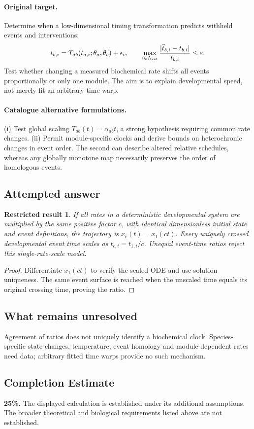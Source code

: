 \documentclass[11pt]{article}
\newtheorem{attemptresult}{Restricted result}[section]
\begin{document}
\paragraph{Original target.}
Determine when a low-dimensional timing transformation predicts withheld events and interventions:
\[
 t_{b,i}=T_{ab}(t_{a,i};\theta_a,\theta_b)+\epsilon_i,
\qquad
\max_{i\in I_{\rm test}}\frac{|\widehat t_{b,i}-t_{b,i}|}{t_{b,i}}\leq\varepsilon.
\]
Test whether changing a measured biochemical rate shifts all events proportionally or only one module. The aim is to explain developmental speed, not merely fit an arbitrary time warp.
\paragraph{Catalogue alternative formulations.}
(i) Test global scaling $T_{ab}(t)=\alpha_{ab}t$, a strong hypothesis requiring common rate changes. (ii) Permit module-specific clocks and derive bounds on heterochronic changes in event order. The second can describe altered relative schedules, whereas any globally monotone map necessarily preserves the order of homologous events.
\subsection{Attempted answer}
\begin{attemptresult}
If all rates in a deterministic developmental system are multiplied by the same positive factor $c$, with identical dimensionless initial state and event definitions, the trajectory is $x_c(t)=x_1(ct)$. Every uniquely crossed developmental event time scales as $t_{c,i}=t_{1,i}/c$. Unequal event-time ratios reject this single-rate-scale model.
\end{attemptresult}
\begin{proof}
Differentiate $x_1(ct)$ to verify the scaled ODE and use solution uniqueness. The same event surface is reached when the unscaled time equals its original crossing time, proving the ratio.
\end{proof}
\subsection{What remains unresolved}
Agreement of ratios does not uniquely identify a biochemical clock. Species-specific state changes, temperature, event homology and module-dependent rates need data; arbitrary fitted time warps provide no such mechanism.
\subsection{Completion Estimate}
\textbf{25\%.} The displayed calculation is established under its additional assumptions. The broader theoretical and biological requirements listed above are not established.
\end{document}
